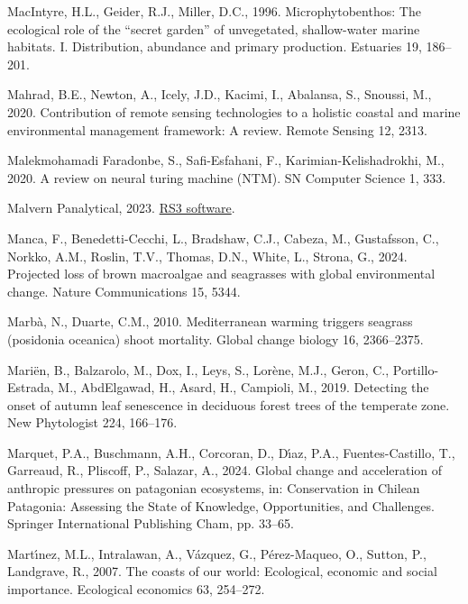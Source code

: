 \documentclass[
  letterpaper,
  11pt,
  english,
  singlespacing,
  headsepline]{MastersDoctoralThesis}
\newlength{\cslhangindent}
\newenvironment{CSLReferences}[2] %
 {\begin{list}{}{%
  \setlength{\itemindent}{0pt}
  \setlength{\leftmargin}{0pt}
  \setlength{\parsep}{0pt}
  \ifodd #1
   \setlength{\leftmargin}{\cslhangindent}
   \setlength{\itemindent}{-1\cslhangindent}
  \fi
  \setlength{\itemsep}{#2\baselineskip}}}
 {\end{list}}
\begin{document}
\begin{CSLReferences}{1}{0}
MacIntyre, H.L., Geider, R.J., Miller, D.C., 1996. Microphytobenthos:
The ecological role of the {``secret garden''} of unvegetated,
shallow-water marine habitats. I. Distribution, abundance and primary
production. Estuaries 19, 186--201.

Mahrad, B.E., Newton, A., Icely, J.D., Kacimi, I., Abalansa, S.,
Snoussi, M., 2020. Contribution of remote sensing technologies to a
holistic coastal and marine environmental management framework: A
review. Remote Sensing 12, 2313.

Malekmohamadi Faradonbe, S., Safi-Esfahani, F., Karimian-Kelishadrokhi,
M., 2020. A review on neural turing machine (NTM). SN Computer Science
1, 333.

Malvern Panalytical, 2023.
\href{https://www.malvernpanalytical.com/en/support/product-support/software/rs3}{RS3
software}.

Manca, F., Benedetti-Cecchi, L., Bradshaw, C.J., Cabeza, M., Gustafsson,
C., Norkko, A.M., Roslin, T.V., Thomas, D.N., White, L., Strona, G.,
2024. Projected loss of brown macroalgae and seagrasses with global
environmental change. Nature Communications 15, 5344.

Marbà, N., Duarte, C.M., 2010. Mediterranean warming triggers seagrass
(posidonia oceanica) shoot mortality. Global change biology 16,
2366--2375.

Mariën, B., Balzarolo, M., Dox, I., Leys, S., Lorène, M.J., Geron, C.,
Portillo-Estrada, M., AbdElgawad, H., Asard, H., Campioli, M., 2019.
Detecting the onset of autumn leaf senescence in deciduous forest trees
of the temperate zone. New Phytologist 224, 166--176.

Marquet, P.A., Buschmann, A.H., Corcoran, D., Dı́az, P.A.,
Fuentes-Castillo, T., Garreaud, R., Pliscoff, P., Salazar, A., 2024.
Global change and acceleration of anthropic pressures on patagonian
ecosystems, in: Conservation in Chilean Patagonia: Assessing the State
of Knowledge, Opportunities, and Challenges. Springer International
Publishing Cham, pp. 33--65.

Martı́nez, M.L., Intralawan, A., Vázquez, G., Pérez-Maqueo, O., Sutton,
P., Landgrave, R., 2007. The coasts of our world: Ecological, economic
and social importance. Ecological economics 63, 254--272.


\end{CSLReferences}
\end{document}
